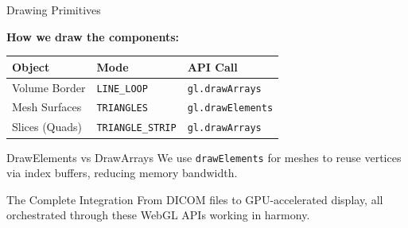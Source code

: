\begin{frame}{Drawing Primitives}


\textbf{How we draw the components:}
\begin{table}
\small
\begin{tabular}{lll}
\hline
\textbf{Object} & \textbf{Mode} & \textbf{API Call} \\ \hline
Volume Border   & \texttt{LINE\_LOOP} & \texttt{gl.drawArrays} \\
Mesh Surfaces   & \texttt{TRIANGLES} & \texttt{gl.drawElements} \\
Slices (Quads)  & \texttt{TRIANGLE\_STRIP} & \texttt{gl.drawArrays} \\ \hline
\end{tabular}
\end{table}

\vfill
\begin{alertblock}{DrawElements vs DrawArrays}
We use \texttt{drawElements} for meshes to reuse vertices via index buffers, reducing memory bandwidth.
\end{alertblock}

\begin{block}{The Complete Integration}
From DICOM files to GPU-accelerated display, all orchestrated through these WebGL APIs working in harmony.
\end{block}
\end{frame}